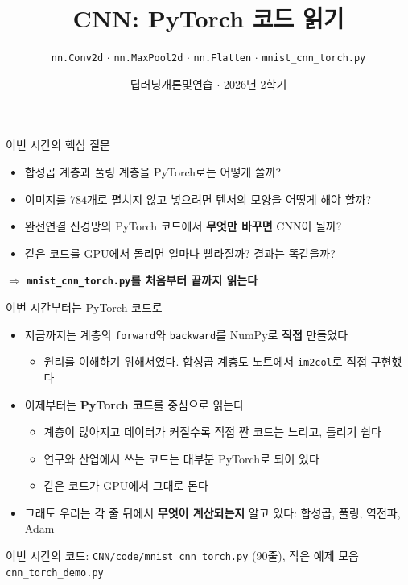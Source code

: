 \documentclass[aspectratio=169,11pt]{beamer}
\title{CNN: PyTorch 코드 읽기}
\subtitle{\texttt{nn.Conv2d} $\cdot$ \texttt{nn.MaxPool2d} $\cdot$ \texttt{nn.Flatten} $\cdot$ \texttt{mnist\_cnn\_torch.py}}
\date{딥러닝개론및연습 $\cdot$ 2026년 2학기}
\newcommand{\code}[1]{\texttt{#1}}
\begin{document}
\begin{frame}[plain]
\titlepage
\end{frame}

\begin{frame}{이번 시간의 핵심 질문}
\begin{keybox}[이번 시간의 핵심 질문]
\begin{itemize}
\item 합성곱 계층과 풀링 계층을 PyTorch로는 어떻게 쓸까?
\item 이미지를 $784$개로 펼치지 않고 넣으려면 텐서의 모양을 어떻게 해야 할까?
\item 완전연결 신경망의 PyTorch 코드에서 \textbf{무엇만 바꾸면} CNN이 될까?
\item 같은 코드를 GPU에서 돌리면 얼마나 빨라질까? 결과는 똑같을까?
\end{itemize}
\end{keybox}
\vskip2mm
\begin{center}
\large $\Rightarrow$ \textbf{\code{mnist\_cnn\_torch.py}를 처음부터 끝까지 읽는다}
\end{center}
\end{frame}

\begin{frame}{이번 시간부터는 PyTorch 코드로}
\begin{itemize}
\item 지금까지는 계층의 \code{forward}와 \code{backward}를 NumPy로 \textbf{직접} 만들었다
\begin{itemize}
\item 원리를 이해하기 위해서였다. 합성곱 계층도 노트에서 \code{im2col}로 직접 구현했다
\end{itemize}
\item 이제부터는 \textbf{PyTorch 코드}를 중심으로 읽는다
\begin{itemize}
\item 계층이 많아지고 데이터가 커질수록 직접 짠 코드는 느리고, 틀리기 쉽다
\item 연구와 산업에서 쓰는 코드는 대부분 PyTorch로 되어 있다
\item 같은 코드가 GPU에서 그대로 돈다
\end{itemize}
\item 그래도 우리는 각 줄 뒤에서 \textbf{무엇이 계산되는지} 알고 있다: 합성곱, 풀링, 역전파, Adam
\end{itemize}
\vskip1mm
\begin{keybox}
\small 이번 시간의 코드: \code{CNN/code/mnist\_cnn\_torch.py} (90줄), 작은 예제 모음 \code{cnn\_torch\_demo.py}
\end{keybox}
\end{frame}
\end{document}
